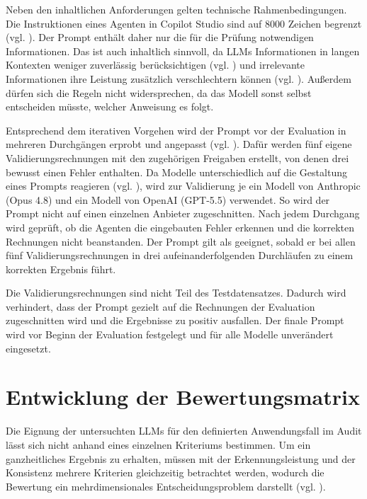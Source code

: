 Neben den inhaltlichen Anforderungen gelten technische Rahmenbedingungen. Die Instruktionen eines Agenten in Copilot Studio sind auf 8000 Zeichen begrenzt (vgl. \cite{microsoft2026declarative}). Der Prompt enthält daher nur die für die Prüfung notwendigen Informationen. Das ist auch inhaltlich sinnvoll, da \acp{LLM} Informationen in langen Kontexten weniger zuverlässig berücksichtigen (vgl. \cite[S.~157]{liu2024lost}) und irrelevante Informationen ihre Leistung zusätzlich verschlechtern können (vgl. \cite[S.~9]{shi2023distracted}). Außerdem dürfen sich die Regeln nicht widersprechen, da das Modell sonst selbst entscheiden müsste, welcher Anweisung es folgt.

Entsprechend dem iterativen Vorgehen wird der Prompt vor der Evaluation in mehreren Durchgängen erprobt und angepasst (vgl. \cite[S.~2]{zamfirescu2023johnny}). Dafür werden fünf eigene Validierungsrechnungen mit den zugehörigen Freigaben erstellt, von denen drei bewusst einen Fehler enthalten. Da Modelle unterschiedlich auf die Gestaltung eines Prompts reagieren (vgl. \cite[S.~6\,f.]{sclar2024quantifying}), wird zur Validierung je ein Modell von Anthropic (Opus 4.8) und ein Modell von OpenAI (GPT-5.5) verwendet. So wird der Prompt nicht auf einen einzelnen Anbieter zugeschnitten. Nach jedem Durchgang wird geprüft, ob die Agenten die eingebauten Fehler erkennen und die korrekten Rechnungen nicht beanstanden. Der Prompt gilt als geeignet, sobald er bei allen fünf Validierungsrechnungen in drei aufeinanderfolgenden Durchläufen zu einem korrekten Ergebnis führt.

Die Validierungsrechnungen sind nicht Teil des Testdatensatzes. Dadurch wird verhindert, dass der Prompt gezielt auf die Rechnungen der Evaluation zugeschnitten wird und die Ergebnisse zu positiv ausfallen. Der finale Prompt wird vor Beginn der Evaluation festgelegt und für alle Modelle unverändert eingesetzt.

\section{Entwicklung der Bewertungsmatrix}
\label{sec:nutzwertanalyse}
\label{sec:bewertungsmatrix}

Die Eignung der untersuchten \acp{LLM} für den definierten Anwendungsfall im Audit lässt sich nicht anhand eines einzelnen Kriteriums bestimmen. Um ein ganzheitliches Ergebnis zu erhalten, müssen mit der Erkennungsleistung und der Konsistenz mehrere Kriterien gleichzeitig betrachtet werden, wodurch die Bewertung ein mehrdimensionales Entscheidungsproblem darstellt (vgl. \cite[S.~116\,f.]{kozlowska2022}).

